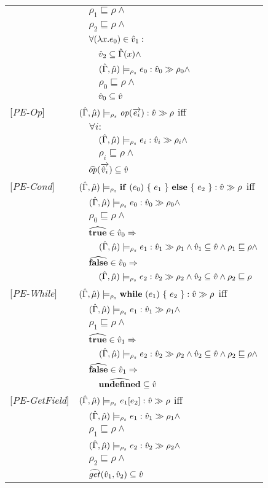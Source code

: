 \begin{tabular}{l l l l}
&&\multicolumn{2}{l}{$\rho_1 \sqsubseteq \rho \wedge$} \\
&&\multicolumn{2}{l}{$\rho_2 \sqsubseteq \rho \wedge$} \\
&&\multicolumn{2}{l}{$\forall (\lambda x.e_0) \in \hat{v}_1 :$}\\
&&&$\hat{v}_2 \subseteq \hat{\Gamma}(x) \wedge$\\
&&&$(\hat{\Gamma},\hat{\mu}) \models_{\rho_s} e_0 : \hat{v}_{0} \gg \rho_{0} \wedge$\\ 
&&&$\rho_0 \sqsubseteq \rho \wedge$\\
&&&$\hat{v}_0 \subseteq \hat{v} $\\
{[\textit{PE-Op}]}&\multicolumn{3}{l}{$(\hat{\Gamma},\hat{\mu}) \models_{\rho_s} \mathit{op} (\overrightarrow{e_i}) : \hat{v} \gg \rho $ iff}\\
&&\multicolumn{2}{l}{$\forall i :$}\\
&&&$(\hat{\Gamma},\hat{\mu}) \models_{\rho_s} e_i : \hat{v}_{i} \gg \rho_{i} \wedge $\\
&&&$\rho_i \sqsubseteq \rho \wedge$\\
&&\multicolumn{2}{l}{$\widehat{op} (\overrightarrow{\hat{v}_i}) \subseteq \hat{v} $}\\
{[\textit{PE-Cond}]}&\multicolumn{3}{l}{$(\hat{\Gamma},\hat{\mu}) \models_{\rho_s} \mathbf{if}\ (e_0)\ \{\ e_1\ \}\ \mathbf{else}\ \{\ e_2\ \} : \hat{v} \gg \rho $ iff}\\
&&\multicolumn{2}{l}{$(\hat{\Gamma},\hat{\mu}) \models_{\rho_s} e_0 : \hat{v}_{0} \gg \rho_{0} \wedge$}\\
&&\multicolumn{2}{l}{$\rho_0 \sqsubseteq \rho \wedge$} \\
&&\multicolumn{2}{l}{$\widehat{\mathbf{true}} \in \hat{v}_0 \Rightarrow$}\\
&&&$(\hat{\Gamma},\hat{\mu}) \models_{\rho_s} e_1 : \hat{v}_{1} \gg \rho_{1} \wedge \hat{v}_1 \subseteq \hat{v} \wedge \rho_1 \sqsubseteq \rho \wedge$ \\
&&\multicolumn{2}{l}{$\widehat{\mathbf{false}} \in \hat{v}_0 \Rightarrow$}\\
&&&$(\hat{\Gamma},\hat{\mu}) \models_{\rho_s} e_2 : \hat{v}_{2} \gg \rho_{2} \wedge \hat{v}_2 \subseteq \hat{v} \wedge \rho_2 \sqsubseteq \rho$ \\
{[\textit{PE-While}]}&\multicolumn{3}{l}{$(\hat{\Gamma},\hat{\mu}) \models_{\rho_s} \mathbf{while}\ (e_1)\ \{\ e_2\ \} : \hat{v} \gg \rho $ iff}\\
&&\multicolumn{2}{l}{$(\hat{\Gamma},\hat{\mu}) \models_{\rho_s} e_1 : \hat{v}_{1} \gg \rho_{1} \wedge $}\\
&&\multicolumn{2}{l}{$\rho_1 \sqsubseteq \rho \wedge$} \\
&&\multicolumn{2}{l}{$\widehat{\mathbf{true}} \in \hat{v}_1 \Rightarrow$}\\
&&&$(\hat{\Gamma},\hat{\mu}) \models_{\rho_s} e_2 : \hat{v}_{2} \gg \rho_{2} \wedge \hat{v}_2 \subseteq \hat{v} \wedge \rho_2 \sqsubseteq \rho \wedge$\\
&&\multicolumn{2}{l}{$\widehat{\mathbf{false}} \in \hat{v}_1 \Rightarrow$}\\
&&&$\widehat{\mathbf{undefined}} \subseteq \hat{v}$\\
{[\textit{PE-GetField}]}&\multicolumn{3}{l}{$(\hat{\Gamma},\hat{\mu}) \models_{\rho_s} e_1[e_2] : \hat{v} \gg \rho $ iff}\\
&&\multicolumn{2}{l}{$ (\hat{\Gamma},\hat{\mu}) \models_{\rho_s} e_1 : \hat{v}_{1} \gg \rho_{1} \wedge $}\\
&&\multicolumn{2}{l}{$\rho_1 \sqsubseteq \rho \wedge$} \\
&&\multicolumn{2}{l}{$ (\hat{\Gamma},\hat{\mu}) \models_{\rho_s} e_2 : \hat{v}_{2} \gg \rho_{2} \wedge $} \\
&&\multicolumn{2}{l}{$\rho_2 \sqsubseteq \rho \wedge$} \\
&&\multicolumn{2}{l}{$\widehat{get} (\hat{v}_1, \hat{v}_2) \subseteq \hat{v}$} \\
\end{tabular}\newpage
